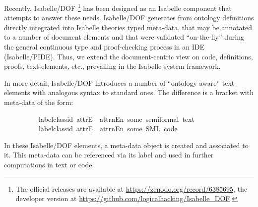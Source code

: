 \begin{isabellebody}
\begin{isamarkuptext}
\vspace{-0.2cm}
Recently, Isabelle/DOF \cite{brucker.ea:isabelledof:2019,brucker.ea:isabelle-ontologies:2018}
\footnote{The official releases are available at \url{https://zenodo.org/record/6385695}, the
  developer version at \url{https://github.com/logicalhacking/Isabelle_DOF}.} 
has been designed as an Isabelle component that attempts to answer these needs. 
 Isabelle/DOF generates from  ontology definitions directly integrated into Isabelle theories
typed meta-data, that may be annotated to a number of document elements and that were 
validated ``on-the-fly'' during the general continuous type and proof-checking process 
in an IDE (Isabelle/PIDE). Thus, we extend the document-centric view on code, definitions, 
proofs, text-elements, etc., prevailing in the Isabelle system framework.

In more detail, Isabelle/DOF introduces a number of ``ontology aware'' text-elements with analogous 
syntax to standard ones. The difference is a bracket with meta-data of the form:

\begin{isabelle}
\ \ \ \ \ \ \ \ \ \ label{\isacharcolon}{\kern0pt}{\isacharcolon}{\kern0pt}classid{\isacharcomma}{\kern0pt}\ attrE\ \isacommand{{\isachardot}{\kern0pt}{\isachardot}{\kern0pt}}\isacommand{{\isachardot}{\kern0pt}}\ attr\isactrlsub n{\isacharequal}{\kern0pt}E\isactrlsub n{\isacharbrackright}{\kern0pt}{\isacartoucheopen}\ some\ semi{\isacharminus}{\kern0pt}formal\ text\ {\isacartoucheclose}\isanewline
\ \ \ \ \ \ \ \ \ \ label{\isacharcolon}{\kern0pt}{\isacharcolon}{\kern0pt}classid{\isacharcomma}{\kern0pt}\ attrE\ \isacommand{{\isachardot}{\kern0pt}{\isachardot}{\kern0pt}}\isacommand{{\isachardot}{\kern0pt}}\ attr\isactrlsub n{\isacharequal}{\kern0pt}E\isactrlsub n{\isacharbrackright}{\kern0pt}{\isacartoucheopen}\ some\ SML\ code\ {\isacartoucheclose}\isanewline
\ \ \ \ \ \ \ \ \ \ \isacommand{{\isachardot}{\kern0pt}{\isachardot}{\kern0pt}}\isacommand{{\isachardot}{\kern0pt}}
\end{isabelle}
In these Isabelle/DOF elements, a meta-data object is created and associated to it. This 
meta-data can be referenced via its label and used in further computations in text or code.


\end{isamarkuptext}
\end{isabellebody}
